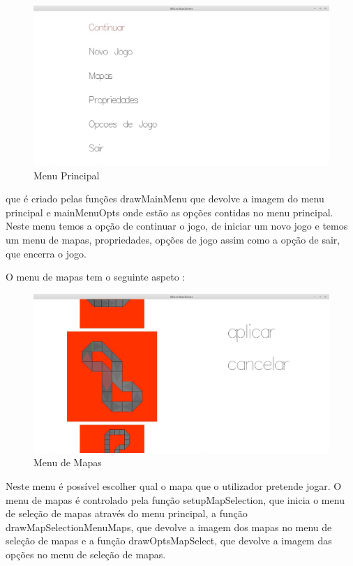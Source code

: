 \documentclass[a4paper]{report} %
\begin{document}
\begin{figure}[!h]
\centering
\includegraphics[scale=0.15]{foto.jpg}
\caption{Menu Principal}
\end{figure}


que é criado pelas funções drawMainMenu que devolve a imagem do menu principal e mainMenuOpts onde estão as opções contidas no menu principal.
Neste menu temos a opção de continuar o jogo, de iniciar um novo jogo e temos um menu de mapas, propriedades, opções de jogo assim como a opção de sair, que encerra o jogo.

O menu de mapas tem o seguinte aspeto :


\begin{figure}[!h]
\centering
\includegraphics[scale=0.15]{foto(1).jpg}
\caption{Menu de Mapas}
\end{figure}


Neste menu é possível escolher qual o mapa que o utilizador pretende jogar.
O menu de mapas é controlado pela função setupMapSelection, que inicia o menu de seleção de mapas através do menu principal, a função drawMapSelectionMenuMaps, que devolve a imagem dos mapas no menu de seleção de mapas e a função drawOptsMapSelect, que devolve a imagem das opções no menu de seleção de mapas.
\end{document}

